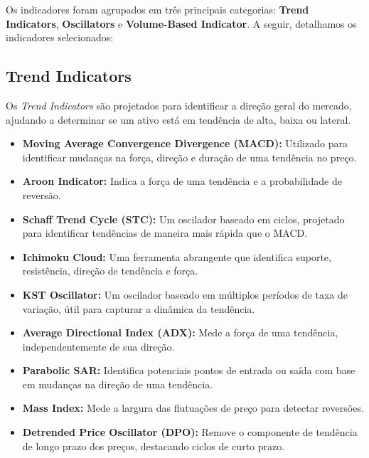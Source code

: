 \documentclass{article}
\begin{document}
Os indicadores foram agrupados em três principais categorias: \textbf{Trend Indicators}, \textbf{Oscillators} e \textbf{Volume-Based Indicator}. A seguir, detalhamos os indicadores selecionados:

\subsection{Trend Indicators}

Os \textit{Trend Indicators} são projetados para identificar a direção geral do mercado, ajudando a determinar se um ativo está em tendência de alta, baixa ou lateral.

\begin{itemize}
    \item \textbf{Moving Average Convergence Divergence (MACD):} Utilizado para identificar mudanças na força, direção e duração de uma tendência no preço.
    
    \item \textbf{Aroon Indicator:} Indica a força de uma tendência e a probabilidade de reversão.

    \item \textbf{Schaff Trend Cycle (STC):} Um oscilador baseado em ciclos, projetado para identificar tendências de maneira mais rápida que o MACD.

    \item \textbf{Ichimoku Cloud:} Uma ferramenta abrangente que identifica suporte, resistência, direção de tendência e força.

    \item \textbf{KST Oscillator:} Um oscilador baseado em múltiplos períodos de taxa de variação, útil para capturar a dinâmica da tendência.

    \item \textbf{Average Directional Index (ADX):} Mede a força de uma tendência, independentemente de sua direção.

    \item \textbf{Parabolic SAR:} Identifica potenciais pontos de entrada ou saída com base em mudanças na direção de uma tendência.

    \item \textbf{Mass Index:} Mede a largura das flutuações de preço para detectar reversões.

    \item \textbf{Detrended Price Oscillator (DPO):} Remove o componente de tendência de longo prazo dos preços, destacando ciclos de curto prazo.
\end{itemize}
\end{document}
